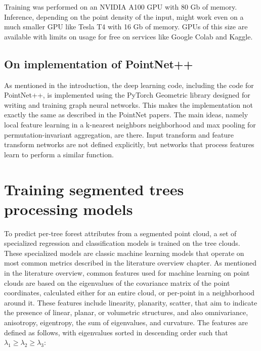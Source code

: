 Training was performed on an NVIDIA A100 GPU with 80 Gb of memory.
Inference, depending on the point density of the input, might work even on a much smaller GPU like Tesla T4 with 16 Gb of memory.
GPUs of this size are available with limits on usage for free on services like Google Colab and Kaggle.

\subsection{On implementation of PointNet++}

As mentioned in the introduction, the deep learning code, including the code for PointNet++, is implemented using the PyTorch Geometric library designed for writing and training graph neural networks.
This makes the implementation not exactly the same as described in the PointNet papers.
The main ideas, namely local feature learning in a k-nearest neighbors neighborhood and max pooling for permutation-invariant aggregation, are there.
Input transform and feature transform networks are not defined explicitly, but networks that process features learn to perform a similar function.

\section{Training segmented trees processing models}\label{sec-training-tree-processors}

To predict per-tree forest attributes from a segmented point cloud, a set of specialized regression and classification models is trained on the tree clouds.
These specialized models are classic machine learning models that operate on most common metrics described in the literature overview chapter.
As mentioned in the literature overview, common features used for machine learning on point clouds are based on the eigenvalues of the covariance matrix of the point coordinates, calculated either for an entire cloud, or per-point in a neighborhood around it.
These features include linearity, planarity, scatter, that aim to indicate the presence of linear, planar, or volumetric structures, and also omnivariance, anisotropy, eigentropy, the sum of eigenvalues, and curvature.
The features are defined as follows, with eigenvalues sorted in descending order such that $\lambda_1 \ge \lambda_2 \ge \lambda_3$:

